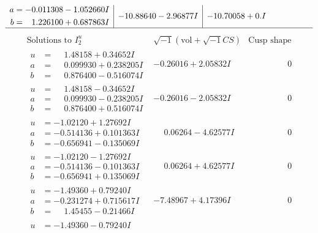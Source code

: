 \documentclass[1p]{elsarticle_modified}
\theoremstyle{definition}
\newcommand{\I}{\sqrt{-1}}
\begin{document}
$$\begin{array}{c|c|c}
\begin{aligned}
a &= -0.011308 - 1.052660 I \\
b &= \phantom{-}1.226100 + 0.687863 I\end{aligned}
 & -10.88640 - 2.96877 I & -10.70058 + 0. I\phantom{ +0.000000I}\\
 \hline 
 \end{array}$$\newpage$$\begin{array}{c|c|c}  
\text{Solutions to }I^u_{2}& \I (\text{vol} + \sqrt{-1}CS) & \text{Cusp shape}\\
 \hline 
\begin{aligned}
u &= \phantom{-}1.48158 + 0.34652 I \\
a &= \phantom{-}0.099930 + 0.238205 I \\
b &= \phantom{-}0.876400 - 0.516074 I\end{aligned}
 & -0.26016 + 2.05832 I & \phantom{-0.000000 } 0 \\ \hline\begin{aligned}
u &= \phantom{-}1.48158 - 0.34652 I \\
a &= \phantom{-}0.099930 - 0.238205 I \\
b &= \phantom{-}0.876400 + 0.516074 I\end{aligned}
 & -0.26016 - 2.05832 I & \phantom{-0.000000 } 0 \\ \hline\begin{aligned}
u &= -1.02120 + 1.27692 I \\
a &= -0.514136 + 0.101363 I \\
b &= -0.656941 - 0.135069 I\end{aligned}
 & \phantom{-}0.06264 - 4.62577 I & \phantom{-0.000000 } 0 \\ \hline\begin{aligned}
u &= -1.02120 - 1.27692 I \\
a &= -0.514136 - 0.101363 I \\
b &= -0.656941 + 0.135069 I\end{aligned}
 & \phantom{-}0.06264 + 4.62577 I & \phantom{-0.000000 } 0 \\ \hline\begin{aligned}
u &= -1.49360 + 0.79240 I \\
a &= -0.231274 + 0.715617 I \\
b &= \phantom{-}1.45455 - 0.21466 I\end{aligned}
 & -7.48967 + 4.17396 I & \phantom{-0.000000 } 0 \\ \hline\begin{aligned}
u &= -1.49360 - 0.79240 I \\

\end{aligned}
\end{array}$$
\end{document}
